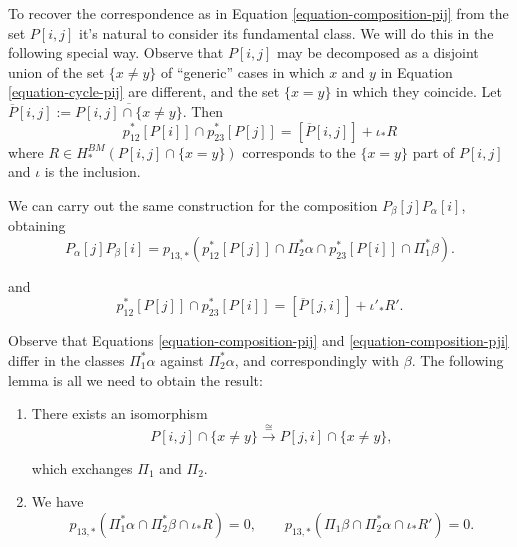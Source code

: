 \medskip\noindent
To recover the correspondence as in
Equation \ref{equation-composition-pij}
from the set $P[i,j]$ it's natural to
consider its
fundamental class.
We will do this in the following special way.
Observe that $P[i,j]$ may be decomposed as a
disjoint union
of the set $\{x \neq y\}$
of ``generic'' cases in which $x$ and $y$ in
Equation \ref{equation-cycle-pij}
are different, and the set $\{x=y\}$ in
which they coincide.
Let
$\overline{P}[i,j]:=\overline{P[i,j]\cap\{x\neq y\}}$.
Then
$$
p_{12}^* [P[i]]\cap p_{23}^*
[P[j]]=[\overline{P}[i,j]]+\iota_*R
$$
where $R \in H_*^{BM}(P[i,j]\cap \{x=y\})$
corresponds
to the $\{x=y\}$ part of $P[i,j]$
and $\iota$ is the inclusion.

\medskip\noindent
We can carry out the same construction
for the composition $P_\beta[j]P_\alpha[i]$,
obtaining
\begin{equation}
\label{equation-composition-pji}
P_\alpha[j]P_\beta[i]
=p_{13,*}(p_{12}^*[P[j]]\cap\Pi_2^*\alpha\cap p_{23}^*[P[i]]\cap\Pi_1^*\beta).
\end{equation}

\noindent
and
\begin{equation}
\label{equation-pji-r}
p_{12}^* [P[j]]\cap p_{23}^*
[P[i]]=[\overline{P}[j,i]]+\iota'_*R'.
\end{equation}

\noindent
Observe that Equations
\ref{equation-composition-pij} and
\ref{equation-composition-pji} differ in the
classes
$\Pi_1^*\alpha$ against $\Pi_2^*\alpha$, and
correspondingly with $\beta$.
The following lemma is all we need to obtain
the result:

\begin{lemma}
\label{lemma-pij}
\begin{enumerate}
\item There exists an isomorphism
\begin{equation}
\label{equation-pij-isomorphism}
P[i,j]\cap\{x \neq
y\}\xrightarrow{\cong}P[j,i]\cap \{x \neq
y\},
\end{equation}

\noindent
which exchanges $\Pi_1$ and $\Pi_2$.

\item We have
\begin{equation}
\label{equation-r}
p_{13,*}(\Pi_1^*\alpha\cap\Pi_2^*\beta\cap\iota_*R)=0,\qquad
p_{13,*}(\Pi_1\beta\cap\Pi_2^*\alpha\cap\iota_*R')=0.
\end{equation}
\end{enumerate}
\end{lemma}

